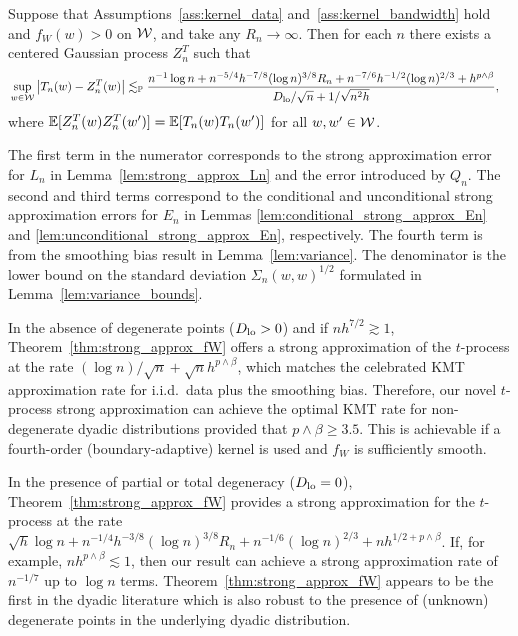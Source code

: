 \begin{theorem}
  \label{thm:strong_approx_fW}

  Suppose that Assumptions~\ref{ass:kernel_data}
  and~\ref{ass:kernel_bandwidth} hold and
  $f_W(w) > 0$ on $\mathcal{W}$, and take any $R_n \to \infty$.
  Then for each $n$ there exists a
  centered Gaussian process $Z_n^{T}$ such that
  \begin{align*}
    &\sup_{w \in \mathcal{W}}
    \left|
    T_n(w)
    -
    Z_n^{T}(w)
    \right|
    \lesssim_{\mathbb{P}}
    \frac{
      n^{-1} \log n
      + n^{-5/4} h^{-7/8} (\log n)^{3/8} R_n
      + n^{-7/6} h^{-1/2} (\log n)^{2/3}
      + h^{p\wedge\beta}}
    {D_{\textup{lo}}/\sqrt{n} + 1/\sqrt{n^2h}},
  \end{align*}
  where $\mathbb{E}[Z_n^T(w)Z_n^T(w')] = \mathbb{E}[T_n(w)T_n(w')]$
  for all $w,w' \in \mathcal{W}$.
\end{theorem}

The first term in the numerator corresponds to
the strong approximation error for $L_n$ in Lemma~\ref{lem:strong_approx_Ln}
and the error introduced by $Q_n$.
The second and third terms correspond to the conditional
and unconditional strong approximation errors for
$E_n$ in Lemmas \ref{lem:conditional_strong_approx_En}
and \ref{lem:unconditional_strong_approx_En}, respectively.
The fourth term is from the smoothing bias result
in Lemma~\ref{lem:variance}.
The denominator is the lower bound on the standard
deviation $\Sigma_n(w,w)^{1/2}$
formulated in Lemma~\ref{lem:variance_bounds}.

In the absence of degenerate points ($D_{\textup{lo}} > 0$) and if
$n h^{7/2}\gtrsim 1$, Theorem~\ref{thm:strong_approx_fW}
offers a strong approximation of the $t$-process at the rate
$(\log n)/\sqrt{n}+\sqrt{n}h^{p\wedge\beta}$, which matches the celebrated KMT
approximation rate for i.i.d.\ data plus the
smoothing bias.
Therefore, our novel $t$-process strong
approximation can achieve the optimal KMT rate for
non-degenerate dyadic
distributions provided that $p\wedge\beta \geq 3.5$.
This is achievable
if a fourth-order (boundary-adaptive) kernel is used
and $f_W$ is sufficiently smooth.

In the presence of partial or total degeneracy ($D_{\textup{lo}} =0$),
Theorem~\ref{thm:strong_approx_fW} provides a strong approximation for the
$t$-process at the rate
$\sqrt{h}\log n + n^{-1/4}h^{-3/8}(\log n)^{3/8} R_n +
n^{-1/6}(\log n)^{2/3} + n h^{1/2+p\wedge\beta}$.
If, for example, $n h^{p\wedge\beta}\lesssim 1$,
then our result can achieve a strong
approximation rate of $n^{-1/7}$
up to $\log n $ terms.
Theorem~\ref{thm:strong_approx_fW}
appears to be the first in the dyadic literature
which is also robust to the presence of (unknown)
degenerate points in the underlying dyadic distribution.

